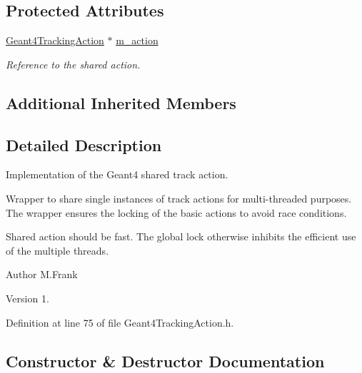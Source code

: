 \subsection*{Protected Attributes}
\begin{DoxyCompactItemize}
\item 
\hyperlink{class_d_d4hep_1_1_simulation_1_1_geant4_tracking_action}{Geant4\+Tracking\+Action} $\ast$ \hyperlink{class_d_d4hep_1_1_simulation_1_1_geant4_shared_tracking_action_ab28be90db22491588dd12675fd21d8cb}{m\+\_\+action}
\begin{DoxyCompactList}\small\item\em Reference to the shared action. \end{DoxyCompactList}\end{DoxyCompactItemize}
\subsection*{Additional Inherited Members}


\subsection{Detailed Description}
Implementation of the Geant4 shared track action. 

Wrapper to share single instances of track actions for multi-\/threaded purposes. The wrapper ensures the locking of the basic actions to avoid race conditions.

Shared action should be \textquotesingle{}fast\textquotesingle{}. The global lock otherwise inhibits the efficient use of the multiple threads.

\begin{DoxyAuthor}{Author}
M.\+Frank 
\end{DoxyAuthor}
\begin{DoxyVersion}{Version}
1. 
\end{DoxyVersion}


Definition at line 75 of file Geant4\+Tracking\+Action.\+h.



\subsection{Constructor \& Destructor Documentation}
\hypertarget{class_d_d4hep_1_1_simulation_1_1_geant4_shared_tracking_action_a8f1dbd60bd175fa470cee4d29aa392bb}{}\label{class_d_d4hep_1_1_simulation_1_1_geant4_shared_tracking_action_a8f1dbd60bd175fa470cee4d29aa392bb} 
